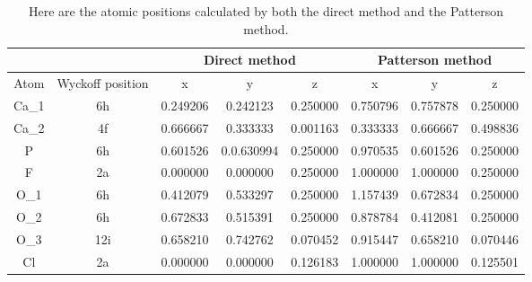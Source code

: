 \documentclass[]{scrartcl}
\newcommand*{\head}{\bfseries}
\newcommand{\rowstyle}[1]{\gdef\currentrowstyle{#1}%
	#1\ignorespaces
}
\begin{document}
\begin{table}[H]
	\centering
	\caption[Atomic positions]{Here are the atomic positions calculated by both the direct method and the Patterson method.}
	\begin{tabular}{cccccccc}
		&&\multicolumn{3}{c}{\rowstyle{\head}Direct method} & \multicolumn{3}{c}{\rowstyle{\head}Patterson method}\\
		\midrule
		Atom & Wyckoff position & x & y & z & x & y & z \\
		Ca\_1 & 6h & 0.249206 & 0.242123 & 0.250000 & 0.750796 & 0.757878 & 0.250000 \\
		Ca\_2 & 4f & 0.666667 & 0.333333 & 0.001163 & 0.333333 & 0.666667 & 0.498836 \\
		P & 6h & 0.601526 & 0.0.630994 & 0.250000 & 0.970535 & 0.601526 & 0.250000 \\ 
		F & 2a & 0.000000 & 0.000000 & 0.250000 & 1.000000 & 1.000000 & 0.250000 \\
		O\_1 & 6h & 0.412079 & 0.533297 & 0.250000 & 1.157439 & 0.672834 & 0.250000 \\
		O\_2 & 6h & 0.672833 & 0.515391 & 0.250000 & 0.878784 & 0.412081 & 0.250000 \\
		O\_3 & 12i & 0.658210 & 0.742762 & 0.070452 & 0.915447 & 0.658210 & 0.070446 \\
		Cl & 2a & 0.000000 & 0.000000 & 0.126183 & 1.000000 & 1.000000 & 0.125501 \\
	\end{tabular}\label{atomicpos}
\end{table}
\end{document}
